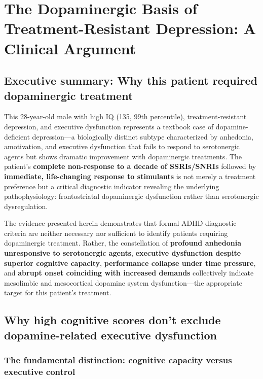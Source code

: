 ﻿\section{The Dopaminergic Basis of Treatment-Resistant Depression: A Clinical Argument}\label{10a_trd_basis-the-dopaminergic-basis-of-treatment-resistant-depression-a-clinical-argument}

\subsection{Executive summary: Why this patient required dopaminergic treatment}\label{10a_trd_basis-executive-summary-why-this-patient-required-dopaminergic-treatment}

This 28-year-old male with high IQ (135, 99th percentile), treatment-resistant depression, and executive dysfunction represents a textbook case of dopamine-deficient depression---a biologically distinct subtype characterized by anhedonia, amotivation, and executive dysfunction that fails to respond to serotonergic agents but shows dramatic improvement with dopaminergic treatments. The patient's \textbf{complete non-response to a decade of SSRIs/SNRIs} followed by \textbf{immediate, life-changing response to stimulants} is not merely a treatment preference but a critical diagnostic indicator revealing the underlying pathophysiology: frontostriatal dopaminergic dysfunction rather than serotonergic dysregulation.

The evidence presented herein demonstrates that formal ADHD diagnostic criteria are neither necessary nor sufficient to identify patients requiring dopaminergic treatment. Rather, the constellation of \textbf{profound anhedonia unresponsive to serotonergic agents}, \textbf{executive dysfunction despite superior cognitive capacity}, \textbf{performance collapse under time pressure}, and \textbf{abrupt onset coinciding with increased demands} collectively indicate mesolimbic and mesocortical dopamine system dysfunction---the appropriate target for this patient's treatment.

\subsection{Why high cognitive scores don't exclude dopamine-related executive dysfunction}\label{10a_trd_basis-why-high-cognitive-scores-dont-exclude-dopamine-related-executive-dysfunction}

\subsubsection{The fundamental distinction: cognitive capacity versus executive control}\label{10a_trd_basis-the-fundamental-distinction-cognitive-capacity-versus-executive-control}

